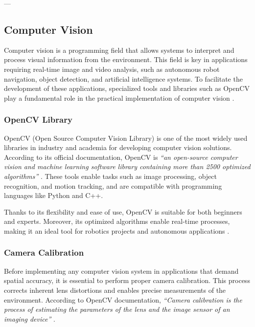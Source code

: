 ---

\subsection{Computer Vision}

    Computer vision is a programming field that allows systems to interpret and process visual information from the environment. This field is key in applications requiring real-time image and video analysis, such as autonomous robot navigation, object detection, and artificial intelligence systems. To facilitate the development of these applications, specialized tools and libraries such as OpenCV play a fundamental role in the practical implementation of computer vision \cite{opencv_docs}.  
    
    \subsubsection{OpenCV Library}
    
    OpenCV (Open Source Computer Vision Library) is one of the most widely used libraries in industry and academia for developing computer vision solutions. According to its official documentation, OpenCV is \textit{“an open-source computer vision and machine learning software library containing more than 2500 optimized algorithms”} \cite{opencv_docs}. These tools enable tasks such as image processing, object recognition, and motion tracking, and are compatible with programming languages like Python and C++.  
    
    Thanks to its flexibility and ease of use, OpenCV is suitable for both beginners and experts. Moreover, its optimized algorithms enable real-time processes, making it an ideal tool for robotics projects and autonomous applications \cite{opencv_docs}.  
    
    \subsubsection{Camera Calibration}
    
    Before implementing any computer vision system in applications that demand spatial accuracy, it is essential to perform proper camera calibration. This process corrects inherent lens distortions and enables precise measurements of the environment. According to OpenCV documentation, \textit{“Camera calibration is the process of estimating the parameters of the lens and the image sensor of an imaging device”} \cite{opencv_calib3d}.  
    
